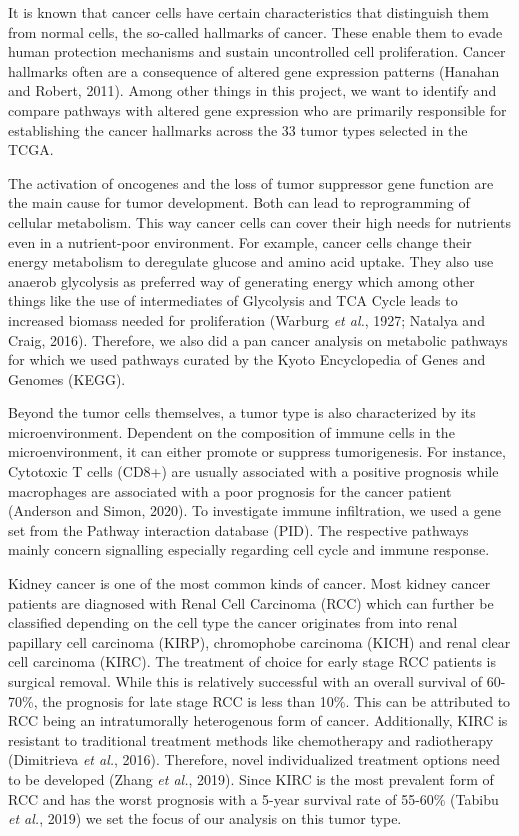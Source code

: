 \documentclass[
  parskip,
  oneside]{scrreprt}
\begin{document}
It is known that cancer cells have certain characteristics that
distinguish them from normal cells, the so-called hallmarks of cancer.
These enable them to evade human protection mechanisms and sustain
uncontrolled cell proliferation. Cancer hallmarks often are a
consequence of altered gene expression patterns (Hanahan and Robert,
2011). Among other things in this project, we want to identify and
compare pathways with altered gene expression who are primarily
responsible for establishing the cancer hallmarks across the 33 tumor
types selected in the TCGA.

The activation of oncogenes and the loss of tumor suppressor gene
function are the main cause for tumor development. Both can lead to
reprogramming of cellular metabolism. This way cancer cells can cover
their high needs for nutrients even in a nutrient-poor environment. For
example, cancer cells change their energy metabolism to deregulate
glucose and amino acid uptake. They also use anaerob glycolysis as
preferred way of generating energy which among other things like the use
of intermediates of Glycolysis and TCA Cycle leads to increased biomass
needed for proliferation (Warburg \emph{et al.}, 1927; Natalya and
Craig, 2016). Therefore, we also did a pan cancer analysis on metabolic
pathways for which we used pathways curated by the Kyoto Encyclopedia of
Genes and Genomes (KEGG).

Beyond the tumor cells themselves, a tumor type is also characterized by
its microenvironment. Dependent on the composition of immune cells in
the microenvironment, it can either promote or suppress tumorigenesis.
For instance, Cytotoxic T cells (CD8+) are usually associated with a
positive prognosis while macrophages are associated with a poor
prognosis for the cancer patient (Anderson and Simon, 2020). To
investigate immune infiltration, we used a gene set from the Pathway
interaction database (PID). The respective pathways mainly concern
signalling especially regarding cell cycle and immune response.

Kidney cancer is one of the most common kinds of cancer. Most kidney
cancer patients are diagnosed with Renal Cell Carcinoma (RCC) which can
further be classified depending on the cell type the cancer originates
from into renal papillary cell carcinoma (KIRP), chromophobe carcinoma
(KICH) and renal clear cell carcinoma (KIRC). The treatment of choice
for early stage RCC patients is surgical removal. While this is
relatively successful with an overall survival of 60-70\%, the prognosis
for late stage RCC is less than 10\%. This can be attributed to RCC
being an intratumorally heterogenous form of cancer. Additionally, KIRC
is resistant to traditional treatment methods like chemotherapy and
radiotherapy (Dimitrieva \emph{et al.}, 2016). Therefore, novel
individualized treatment options need to be developed (Zhang \emph{et
al.}, 2019). Since KIRC is the most prevalent form of RCC and has the
worst prognosis with a 5-year survival rate of 55-60\% (Tabibu \emph{et
al.}, 2019) we set the focus of our analysis on this tumor type.
\end{document}
